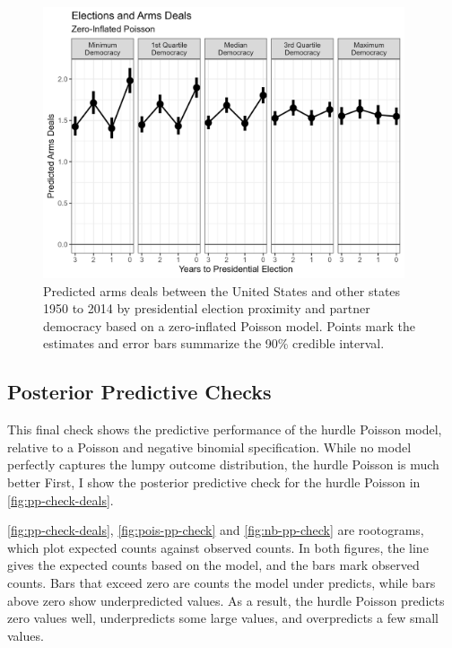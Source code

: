 \documentclass[12pt]{article}
\begin{document}
\begin{figure}[htpb]
	\centering
		\includegraphics[width=0.95\textwidth]{deals-pred-zip.png}
	\caption{{Predicted arms deals between the United States and other states 1950 to 2014 by presidential election proximity and partner democracy based on a zero-inflated Poisson model. Points mark the estimates and error bars summarize the 90\% credible interval.}}
	\label{fig:deals-pred-zip}
\end{figure}

\newpage

\subsection{Posterior Predictive Checks}


This final check shows the predictive performance of the hurdle Poisson model, relative to a Poisson and negative binomial specification. 
While no model perfectly captures the lumpy outcome distribution, the hurdle Poisson is much better 
First, I show the posterior predictive check for the hurdle Poisson in \autoref{fig:pp-check-deals}. 


\autoref{fig:pp-check-deals}, \autoref{fig:pois-pp-check} and \autoref{fig:nb-pp-check} are rootograms, which plot expected counts against observed counts. 
In both figures, the line gives the expected counts based on the model, and the bars mark observed counts. 
Bars that exceed zero are counts the model under predicts, while bars above zero show underpredicted values. 
As a result, the hurdle Poisson predicts zero values well, underpredicts some large values, and overpredicts a few small values. 
\end{document}
